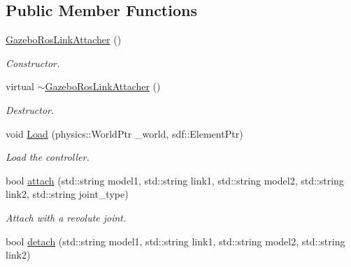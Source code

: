\subsection*{Public Member Functions}
\begin{DoxyCompactItemize}
\item 
\hyperlink{classgazebo_1_1GazeboRosLinkAttacher_a78371f65eeba823c1ba2d9afa1ec6947}{Gazebo\+Ros\+Link\+Attacher} ()\hypertarget{classgazebo_1_1GazeboRosLinkAttacher_a78371f65eeba823c1ba2d9afa1ec6947}{}\label{classgazebo_1_1GazeboRosLinkAttacher_a78371f65eeba823c1ba2d9afa1ec6947}

\begin{DoxyCompactList}\small\item\em Constructor. \end{DoxyCompactList}\item 
virtual \hyperlink{classgazebo_1_1GazeboRosLinkAttacher_a11bae998a168b982dbe92789904570db}{$\sim$\+Gazebo\+Ros\+Link\+Attacher} ()\hypertarget{classgazebo_1_1GazeboRosLinkAttacher_a11bae998a168b982dbe92789904570db}{}\label{classgazebo_1_1GazeboRosLinkAttacher_a11bae998a168b982dbe92789904570db}

\begin{DoxyCompactList}\small\item\em Destructor. \end{DoxyCompactList}\item 
void \hyperlink{classgazebo_1_1GazeboRosLinkAttacher_a11e7446b442f0cdbde9ca5d7947868c6}{Load} (physics\+::\+World\+Ptr \+\_\+world, sdf\+::\+Element\+Ptr)\hypertarget{classgazebo_1_1GazeboRosLinkAttacher_a11e7446b442f0cdbde9ca5d7947868c6}{}\label{classgazebo_1_1GazeboRosLinkAttacher_a11e7446b442f0cdbde9ca5d7947868c6}

\begin{DoxyCompactList}\small\item\em Load the controller. \end{DoxyCompactList}\item 
bool \hyperlink{classgazebo_1_1GazeboRosLinkAttacher_aa78798706ecdfe0dcbf905efbfc810fe}{attach} (std\+::string model1, std\+::string link1, std\+::string model2, std\+::string link2, std\+::string joint\+\_\+type)\hypertarget{classgazebo_1_1GazeboRosLinkAttacher_aa78798706ecdfe0dcbf905efbfc810fe}{}\label{classgazebo_1_1GazeboRosLinkAttacher_aa78798706ecdfe0dcbf905efbfc810fe}

\begin{DoxyCompactList}\small\item\em Attach with a revolute joint. \end{DoxyCompactList}\item 
bool \hyperlink{classgazebo_1_1GazeboRosLinkAttacher_a83db223615f28836f6f3cdc6590ed2c7}{detach} (std\+::string model1, std\+::string link1, std\+::string model2, std\+::string link2)\hypertarget{classgazebo_1_1GazeboRosLinkAttacher_a83db223615f28836f6f3cdc6590ed2c7}{}\label{classgazebo_1_1GazeboRosLinkAttacher_a83db223615f28836f6f3cdc6590ed2c7}


\end{DoxyCompactItemize}
